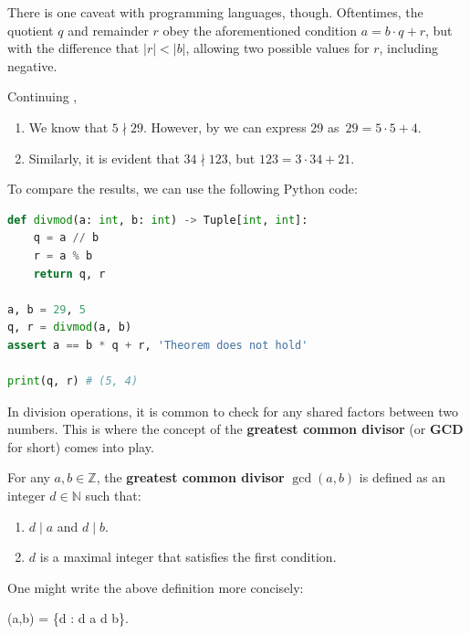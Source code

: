 \documentclass[../lecture-notes-148x210.tex]{subfiles}
\begin{document}
\begin{remark}
    There is one caveat with programming languages, though. Oftentimes, the
    quotient $q$ and remainder $r$ obey the aforementioned condition $a=b\cdot q+r$,
    but with the difference that $|r| < |b|$, allowing two possible values for $r$,
    including negative. 
\end{remark}

\begin{example} \label{example:divisibility_2}
    Continuing , \hfill
    \begin{enumerate}
        \item We know that $5 \nmid 29$. However, by  we can express 29 
        as~$29 = 5 \cdot 5 + 4$.
        \item Similarly, it is evident that $34 \nmid 123$, but $123 = 3 \cdot 34 + 21$.
    \end{enumerate}

    To compare the results, we can use the following Python code:
    \begin{lstlisting}[language=Python, numbers=none]
def divmod(a: int, b: int) -> Tuple[int, int]:
    q = a // b
    r = a % b
    return q, r
    
a, b = 29, 5
q, r = divmod(a, b)
assert a == b * q + r, 'Theorem does not hold'

print(q, r) # (5, 4)
\end{lstlisting}
\end{example}

In division operations, it is common to check for any shared factors between two
numbers. This is where the concept of the \textbf{greatest common divisor} (or
\textbf{GCD} for short) comes into play.

\begin{definition}[GCD]
    For any $a, b \in \mathbb{Z}$, the \textbf{greatest common divisor} $\gcd(a, b)$ is defined as an integer $d \in \mathbb{N}$ such that:
    \begin{enumerate}
        \item $d \mid a$ and $d \mid b$.
        \item $d$ is a maximal integer that satisfies the first condition.
    \end{enumerate}

    One might write the above definition more concisely:
    \begin{xequation}
        \gcd(a,b) = \max\{d \in {}: d \mid a \;  \; d \mid b\}.
    \end{xequation}
\end{definition}
\end{document}
